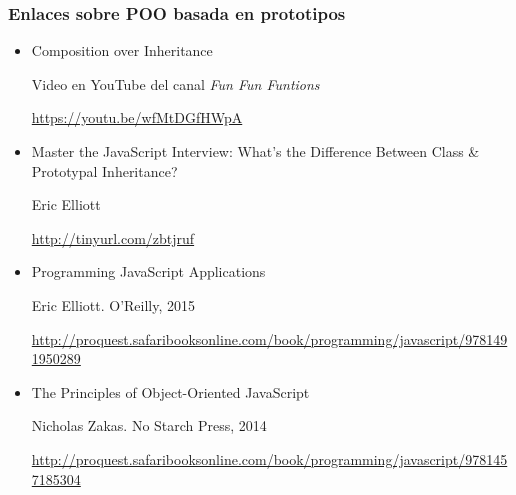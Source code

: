 \documentclass[ucs]{beamer}
\begin{document}
\begin{frame}[fragile]
\frametitle{Enlaces sobre POO basada en prototipos}
\begin{itemize}
\item
Composition over Inheritance

Video en YouTube del canal \emph{Fun Fun Funtions}

\begin{tiny}
\begin{flushright}
\url{https://youtu.be/wfMtDGfHWpA}
\end{flushright}
\end{tiny}

\item
Master the JavaScript Interview: What’s the Difference Between Class \& Prototypal Inheritance?

Eric Elliott
\begin{tiny}
\begin{flushright}
\url{http://tinyurl.com/zbtjruf}
\end{flushright}
\end{tiny}

\item
Programming JavaScript Applications

Eric Elliott. O'Reilly, 2015
\begin{tiny}
\begin{flushright}
\url{http://proquest.safaribooksonline.com/book/programming/javascript/9781491950289}
\end{flushright}
\end{tiny}

\item
The Principles of Object-Oriented JavaScript

Nicholas Zakas.
No Starch Press, 2014
\begin{tiny}
\begin{flushright}
\url{http://proquest.safaribooksonline.com/book/programming/javascript/9781457185304}
\end{flushright}
\end{tiny}
\end{itemize}
\end{frame}
\end{document}
